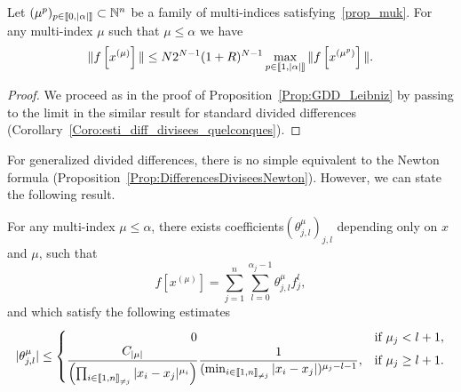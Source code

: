 \documentclass[AHL,Unicode,longabstracts]{cedram}
\newcommand{\llbracket}{\mathopen{[\mkern -2.7mu[}}
\newcommand{\rrbracket}{\mathclose{]\mkern -2.7mu]}}
\newcommand{\inter}[2]{\llbracket #1,#2 \rrbracket}
\newcommand{\interexclu}[3]{\llbracket #1,#2\rrbracket_{\neq #3}}
\newcommand{\N}{\mathbb{N}}
\begin{document}
\begin{prop}\label{Prop:Diagonale_GDD}
Let $(\mu^p)_{p\in \inter{0}{|\alpha|}} \subset \N^n $ be a family of multi-indices satisfying~\eqref{prop_muk}. For any multi-index $\mu$ such that $\mu\leq \alpha$ we have
\[
\| f\left[x^{(\mu)}\right] \| \leq N 2^{N-1} (1+R)^{N-1} \max_{p\in \inter{1}{|\alpha|}} \|f\left[x^{(\mu^p)}\right]\|.
\]
\end{prop}

\begin{proof}
We proceed as in the proof of Proposition~\ref{Prop:GDD_Leibniz} by passing to the limit in the similar result for standard divided differences (Corollary~\ref{Coro:esti_diff_divisees_quelconques}).
\end{proof}

For generalized divided differences, there is no simple equivalent to the Newton formula (Proposition~\ref{Prop:DifferencesDiviseesNewton}). However, we can state the following result.

\begin{prop}\label{Prop:NewtonGDD}
For any multi-index $\mu\leq \alpha$, there exists coefficients\linebreak$(\theta^\mu_{j,l})_{j,l}$ depending only on $x$ and $\mu$, such that
\[
f[x^{(\mu)}] = \sum_{j=1}^n \sum_{l=0}^{\alpha_j-1} \theta^\mu_{j,l} f_j^l,
\]
and which satisfy the following estimates
\[
|\theta^\mu_{j,l}| \leq
\begin{cases}
\mkern180mu 0 & \text{if }\mu_j<l+1,\\
\displaystyle \frac{C_{|\mu|}}{\left(\prod_{i\in\interexclu{1}{n}{j}} |x_i-x_j|^{\mu_i}\right)} \frac{1}{(\min_{i\in\interexclu{1}{n}{j}} |x_i-x_j|)^{\mu_j-l-1}}, & \text{if }\mu_j\geq l+1.
\end{cases}
\]
\end{prop}
\end{document}
